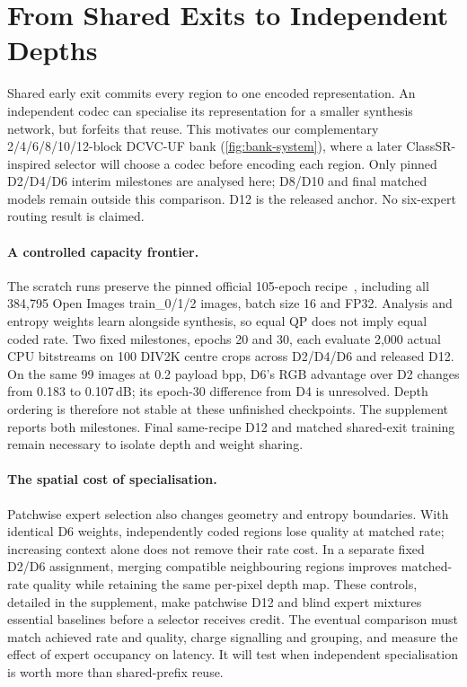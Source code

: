 \section{From Shared Exits to Independent Depths}
\label{sec:depth}

Shared early exit commits every region to one encoded representation.
An independent codec can specialise its representation for a smaller
synthesis network, but forfeits that reuse. This motivates our complementary
2/4/6/8/10/12-block DCVC-UF bank (\cref{fig:bank-system}), where a later
ClassSR-inspired selector will choose a codec before encoding each region.
Only pinned D2/D4/D6 interim milestones are analysed here; D8/D10 and
final matched models remain outside this comparison. D12 is the released
anchor. No six-expert routing result is claimed.

\paragraph{A controlled capacity frontier.}
The scratch runs preserve the pinned official 105-epoch
recipe~\cite{microsoft2026training}, including all 384,795 Open Images
train\_0/1/2 images, batch size 16 and FP32. Analysis and entropy weights
learn alongside synthesis, so equal QP does not imply equal coded rate.
Two fixed milestones, epochs 20 and 30, each evaluate 2,000 actual CPU
bitstreams on 100 DIV2K centre crops across D2/D4/D6 and released D12.
On the same 99 images at 0.2 payload bpp, D6's RGB advantage over D2
changes from 0.183 to 0.107\,dB; its epoch-30 difference from D4 is
unresolved. Depth ordering is therefore not stable at these unfinished
checkpoints. The supplement reports both milestones. Final same-recipe
D12 and matched shared-exit training remain necessary to isolate depth
and weight sharing.

\paragraph{The spatial cost of specialisation.}
Patchwise expert selection also changes geometry and entropy boundaries.
With identical D6 weights, independently coded regions lose quality at
matched rate; increasing context alone does not remove their rate cost.
In a separate fixed D2/D6 assignment, merging compatible neighbouring
regions improves matched-rate quality while retaining the same per-pixel
depth map. These controls, detailed in the supplement, make patchwise D12
and blind expert mixtures essential baselines before a selector receives
credit. The eventual comparison must match achieved rate and quality,
charge signalling and grouping, and measure the effect of expert occupancy
on latency. It will test when independent specialisation is worth more
than shared-prefix reuse.
